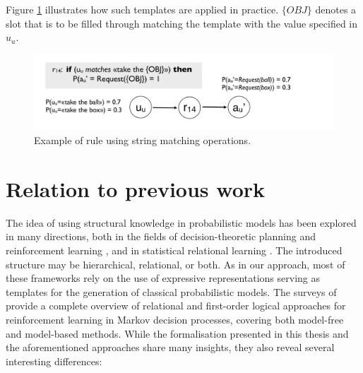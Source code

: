 Figure \ref{fig:stringmanip} illustrates how such templates are applied in practice.  $\{OBJ\}$ denotes a slot that is to be filled through matching the template with the value specified in $u_u$. 
\begin{figure}[ht]
\centering
\includegraphics[scale=0.25]{imgs/stringmanip.pdf}
\caption{Example of rule using string matching operations.}
\label{fig:stringmanip}
\end{figure}

\section{Relation to previous work}
\label{sec:relatedwork}

The idea of using structural knowledge in probabilistic models has been explored in many directions, both in the fields of decision-theoretic planning and reinforcement learning \citep{Hauskrecht98,Pineau:2004,KerstingR04,lang10jair,Otterlo2012}, and in statistical relational learning \citep{Jaeger01,Richardson:2006,getoor:srlbook07}.  The introduced structure may be hierarchical, relational, or both. As in our approach, most of these frameworks rely on the use of expressive representations serving as templates for the generation of classical probabilistic models.  The surveys of \cite{Otterlo2006,Otterlo2012} provide a complete overview of relational and first-order logical approaches for reinforcement learning in Markov decision processes, covering both model-free and model-based methods.  While the formalisation presented in this thesis and the aforementioned approaches share many insights, they also reveal several interesting differences: 

